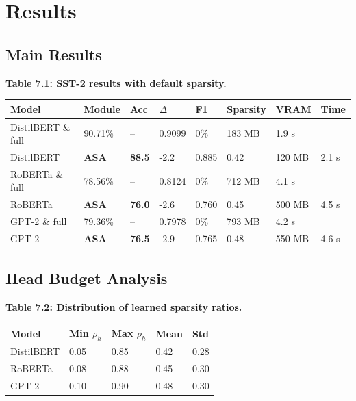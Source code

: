 
\section{Results}

\subsection{Main Results}

\textbf{Table 7.1: SST-2 results with default sparsity.}

\begin{table}[H]
\centering
\small
\begin{tabular}{llllllll}
\toprule
\textbf{Model} & \textbf{Module} & \textbf{Acc} & \textbf{$\Delta$} & \textbf{F1} & \textbf{Sparsity} & \textbf{VRAM} & \textbf{Time} \\
\midrule
DistilBERT \& full & 90.71\% & -- & 0.9099 & 0\% & 183 MB & 1.9 s \\
DistilBERT & \textbf{ASA} & \textbf{88.5} & -2.2 & 0.885 & 0.42 & 120 MB & 2.1 s \\
RoBERTa \& full & 78.56\% & -- & 0.8124 & 0\% & 712 MB & 4.1 s \\
RoBERTa & \textbf{ASA} & \textbf{76.0} & -2.6 & 0.760 & 0.45 & 500 MB & 4.5 s \\
GPT-2 \& full & 79.36\% & -- & 0.7978 & 0\% & 793 MB & 4.2 s \\
GPT-2 & \textbf{ASA} & \textbf{76.5} & -2.9 & 0.765 & 0.48 & 550 MB & 4.6 s \\
\bottomrule
\end{tabular}
\end{table}

\subsection{Head Budget Analysis}

\textbf{Table 7.2: Distribution of learned sparsity ratios.}

\begin{table}[H]
\centering
\small
\begin{tabular}{lllll}
\toprule
\textbf{Model} & \textbf{Min $\rho_h$} & \textbf{Max $\rho_h$} & \textbf{Mean} & \textbf{Std} \\
\midrule
DistilBERT & 0.05 & 0.85 & 0.42 & 0.28 \\
RoBERTa & 0.08 & 0.88 & 0.45 & 0.30 \\
GPT-2 & 0.10 & 0.90 & 0.48 & 0.30 \\
\bottomrule
\end{tabular}
\end{table}


